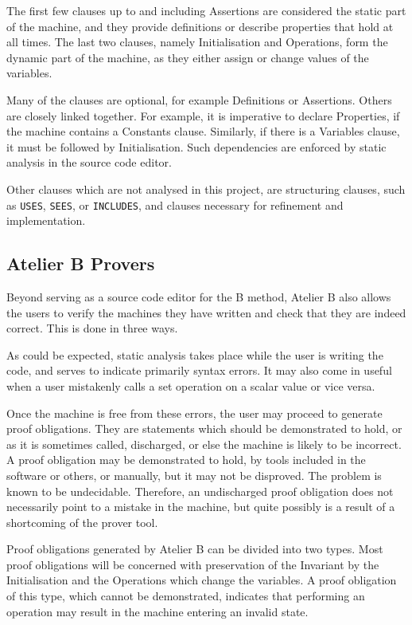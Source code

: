 \documentclass[12pt,journal,duplex]{IEEEtran}
\begin{document}
	The first few clauses up to and including Assertions are considered the static part of the machine, and they provide definitions or describe properties that hold at all times. The last two clauses, namely Initialisation and Operations, form the dynamic part of the machine, as they either assign or change values of the variables.

	Many of the clauses are optional, for example Definitions or Assertions. Others are closely linked together. For example, it is imperative to declare Properties, if the machine contains a Constants clause. Similarly, if there is a Variables clause, it must be followed by Initialisation. Such dependencies are enforced by static analysis in the source code editor.

	Other clauses which are not analysed in this project, are structuring clauses, such as \texttt{USES}, \texttt{SEES}, or \texttt{INCLUDES}, and clauses necessary for refinement and implementation.

	\subsection{Atelier B Provers}
	Beyond serving as a source code editor for the B method, Atelier B also allows the users to verify the machines they have written and check that they are indeed correct. This is done in three ways.

	As could be expected, static analysis takes place while the user is writing the code, and serves to indicate primarily syntax errors. It may also come in useful when a user mistakenly calls a set operation on a scalar value or vice versa.

	Once the machine is free from these errors, the user may proceed to generate proof obligations. They are statements which should be demonstrated to hold, or as it is sometimes called, discharged, or else the machine is likely to be incorrect. A proof obligation may be demonstrated to hold, by tools included in the software or others, or manually, but it may not be disproved. The problem is known to be undecidable\cite{sipser}. Therefore, an undischarged proof obligation does not necessarily point to a mistake in the machine, but quite possibly is a result of a shortcoming of the prover tool.

	Proof obligations generated by Atelier B can be divided into two types. Most proof obligations will be concerned with preservation of the Invariant by the Initialisation and the Operations which change the variables. A proof obligation of this type, which cannot be demonstrated, indicates that performing an operation may result in the machine entering an invalid state.
\end{document}
